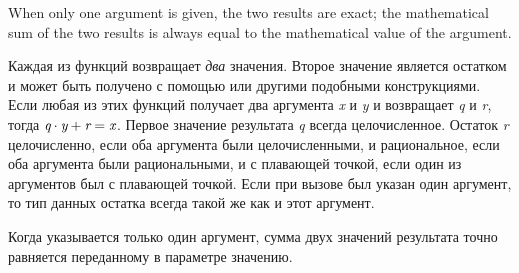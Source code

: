\begin{defun}[Function]
When only one argument is given, the two results are exact;
the mathematical sum of the two results is always equal to the
mathematical value of the argument.

Каждая из функций возвращает \emph{два} значения. Второе значение является
остатком и может быть получено с помощью  или другими
подобными конструкциями.
Если любая из этих функций получает два аргумента \emph{x} и \emph{y} и
возвращает \emph{q} и \emph{r}, тогда  $\emph{q} \cdot
\emph{y}+\emph{r}=\emph{x}$.
Первое значение результата \emph{q} всегда целочисленное.
Остаток \emph{r} целочисленно, если оба аргумента были целочисленными, и
рациональное, если оба аргумента были рациональными,
и с плавающей точкой, если один из аргументов был с плавающей точкой.
Если при вызове был указан один аргумент, то тип данных остатка всегда такой же
как и этот аргумент.

Когда указывается только один аргумент, сумма двух значений результата точно
равняется переданному в параметре значению.
\end{defun}

